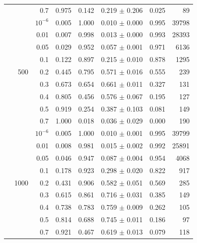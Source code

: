 \documentclass[12pt,a4paper]{article}
\begin{document}
\begin{table}[H]
\begin{tabular}{rrrrrrrr}
 & & 0.7 & 0.975 & 0.142 & 0.219 $\pm$ 0.206 & 0.025 & 89 \\
\addlinespace
\multirow{9}{*}{200} & \multirow{9}{*}{500} & $10^{-6}$ & 0.005 & 1.000 & 0.010 $\pm$ 0.000 & 0.995 & 39798 \\
 & & 0.01 & 0.007 & 0.998 & 0.013 $\pm$ 0.000 & 0.993 & 28393 \\
 & & 0.05 & 0.029 & 0.952 & 0.057 $\pm$ 0.001 & 0.971 & 6136 \\
 & & 0.1 & 0.122 & 0.897 & 0.215 $\pm$ 0.010 & 0.878 & 1295 \\
 & & 0.2 & 0.445 & 0.795 & 0.571 $\pm$ 0.016 & 0.555 & 239 \\
 & & 0.3 & 0.673 & 0.654 & 0.661 $\pm$ 0.011 & 0.327 & 131 \\
 & & 0.4 & 0.805 & 0.456 & 0.576 $\pm$ 0.067 & 0.195 & 127 \\
 & & 0.5 & 0.919 & 0.254 & 0.387 $\pm$ 0.103 & 0.081 & 149 \\
 & & 0.7 & 1.000 & 0.018 & 0.036 $\pm$ 0.029 & 0.000 & 190 \\
\addlinespace
\multirow{9}{*}{200} & \multirow{9}{*}{1000} & $10^{-6}$ & 0.005 & 1.000 & 0.010 $\pm$ 0.001 & 0.995 & 39799 \\
 & & 0.01 & 0.008 & 0.981 & 0.015 $\pm$ 0.002 & 0.992 & 25891 \\
 & & 0.05 & 0.046 & 0.947 & 0.087 $\pm$ 0.004 & 0.954 & 4068 \\
 & & 0.1 & 0.178 & 0.923 & 0.298 $\pm$ 0.020 & 0.822 & 917 \\
 & & 0.2 & 0.431 & 0.906 & 0.582 $\pm$ 0.051 & 0.569 & 285 \\
 & & 0.3 & 0.615 & 0.861 & 0.716 $\pm$ 0.031 & 0.385 & 149 \\
 & & 0.4 & 0.738 & 0.783 & 0.759 $\pm$ 0.009 & 0.262 & 105 \\
 & & 0.5 & 0.814 & 0.688 & 0.745 $\pm$ 0.011 & 0.186 & 97 \\
 & & 0.7 & 0.921 & 0.467 & 0.619 $\pm$ 0.013 & 0.079 & 118 \\
\bottomrule
\end{tabular}
\end{table}
\newpage
\end{document}
